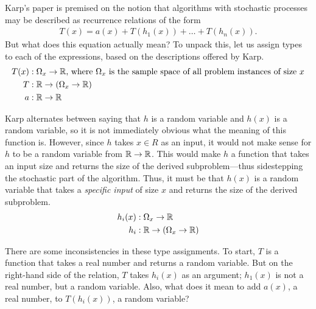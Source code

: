 Karp's paper is premised on the notion that algorithms with stochastic processes may be described as 
recurrence relations of the form
\begin{align*}
T(x) = a(x) + T(h_1(x)) + \dots + T(h_n(x)).
\end{align*}
But what does this equation actually mean? To unpack this, let us assign types to each of the expressions,
based on the descriptions offered by Karp. 
\begin{align*}
T(x) &: \Omega_x \rightarrow \mathbb{R} \text{, where } \Omega_x \text{ is the sample space of all problem instances of size } x \\
T &: \mathbb{R} \rightarrow (\Omega_x \rightarrow \mathbb{R}) \\ 
a &: \mathbb{R} \rightarrow \mathbb{R}
\end{align*}

Karp alternates between saying that $h$ is a random variable and $h(x)$ is a random variable, so it is not immediately obvious 
what the meaning of this function is. However, since $h$ takes $x \in R$ as an input, it would not make sense for $h$ to be a 
random variable from $\mathbb{R} \rightarrow \mathbb{R}$. This would make $h$ a function that takes an input size and returns the 
size of the derived subproblem---thus sidestepping the stochastic part of the algorithm. Thus, it must be that $h(x)$ is a random
variable that takes a \emph{specific input} of size $x$ and returns the size of the derived subproblem.
\begin{align*}
h_i(x) &: \Omega_x \rightarrow \mathbb{R} \\
h_i &: \mathbb{R} \rightarrow (\Omega_x \rightarrow \mathbb{R}) 
\end{align*} 

There are some inconsistencies in these type assignments. To start, $T$ is a function that takes a real number and 
returns a random variable. But on the right-hand side of the relation, $T$ takes $h_i(x)$ as an argument; $h_1(x)$ is
not a real number, but a random variable. Also, what does it mean to add $a(x)$, a real number, to $T(h_i(x))$, 
a random variable? 